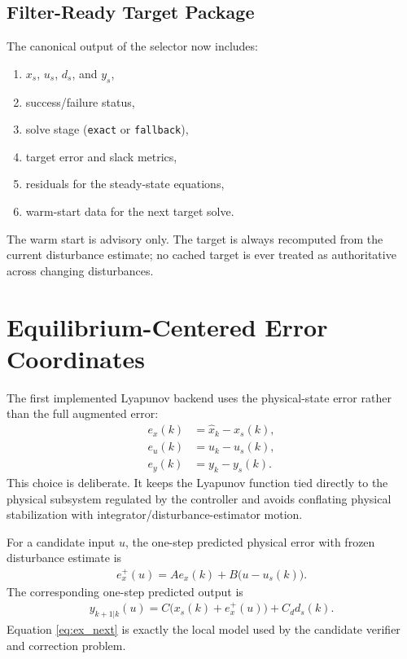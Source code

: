 \documentclass[11pt]{article}
\begin{document}
\subsection{Filter-Ready Target Package}
The canonical output of the selector now includes:
\begin{enumerate}[leftmargin=*]
\item $x_s$, $u_s$, $d_s$, and $y_s$,
\item success/failure status,
\item solve stage (\texttt{exact} or \texttt{fallback}),
\item target error and slack metrics,
\item residuals for the steady-state equations,
\item warm-start data for the next target solve.
\end{enumerate}
The warm start is advisory only. The target is always recomputed from the current disturbance estimate; no cached target is ever treated as authoritative across changing disturbances.

\section{Equilibrium-Centered Error Coordinates}
The first implemented Lyapunov backend uses the physical-state error rather than the full augmented error:
\begin{align}
e_x(k) &= \hat x_k - x_s(k), \label{eq:ex_def}\\
e_u(k) &= u_k - u_s(k), \label{eq:eu_def}\\
e_y(k) &= y_k - y_s(k). \label{eq:ey_def}
\end{align}
This choice is deliberate. It keeps the Lyapunov function tied directly to the physical subsystem regulated by the controller and avoids conflating physical stabilization with integrator/disturbance-estimator motion.

For a candidate input $u$, the one-step predicted physical error with frozen disturbance estimate is
\begin{align}
e_x^+(u)
= A e_x(k) + B\big(u-u_s(k)\big). \label{eq:ex_next}
\end{align}
The corresponding one-step predicted output is
\begin{align}
y_{k+1|k}(u)
= C\big(x_s(k) + e_x^+(u)\big) + C_d d_s(k). \label{eq:y_next_pred}
\end{align}
Equation \eqref{eq:ex_next} is exactly the local model used by the candidate verifier and correction problem.
\end{document}
